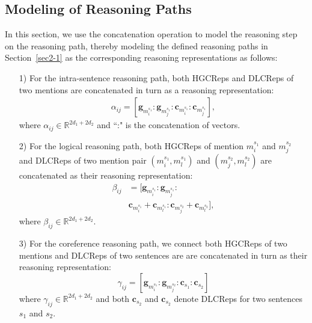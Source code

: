 \documentclass[11pt,a4paper]{article}
\begin{document}
\subsection{Modeling of Reasoning Paths}
\label{sec3-3}
In this section, we use the concatenation operation to model the reasoning step on the reasoning path, thereby modeling the defined reasoning paths in Section~\ref{sec2-1} as the corresponding reasoning representations as follows:
\begin{enumerate}
\item[1)] For the intra-sentence reasoning path, both HGCReps and DLCReps of two mentions are concatenated in turn as a reasoning representation:
\begin{equation}
\begin{aligned}
\alpha_{ij}=[\textbf{g}_{m_i^{s_1}}:\textbf{g}_{m_j^{s_1}}:\textbf{c}_{m_i^{s_1}}:\textbf{c}_{m_j^{s_1}}],
\label{eq:intrasetnecefeature}
\end{aligned}
\end{equation}
where $\alpha_{ij}\in \mathbb{R}^{2 d_1+2 d_2}$ and ``:" is the concatenation of vectors.

\item[2)] For the logical reasoning path, both HGCReps of mention $m_i^{s_1}$ and $m_j^{s_2}$ and DLCReps of two mention pair $(m_i^{s_1},m_l^{s_1})$ and $(m_j^{s_2},m_l^{s_2})$ are concatenated as their reasoning representation: 
\begin{equation}
\begin{aligned}
\beta_{ij}&=[\textbf{g}_{m_i^{s_1}}:\textbf{g}_{m_j^{s_1}}:\\
&\textbf{c}_{m_i^{s_1}}+\textbf{c}_{m_l^{s_1}}:\textbf{c}_{m_j^{s_2}}+\textbf{c}_{m_l^{s_2}}],
\end{aligned}
\label{eq:logicalfeature}
\end{equation}
where $\beta_{ij}\in \mathbb{R}^{2 d_1+2 d_2}$.

\item[3)] For the coreference reasoning path, we connect both HGCReps of two mentions and DLCReps of two sentences are are concatenated in turn as their reasoning representation:
\begin{equation}
\gamma_{ij}=[\textbf{g}_{m_i^{s_1}}:\textbf{g}_{m_j^{s_2}}:\textbf{c}_{s_1}:\textbf{c}_{s_2}]
\label{eq:coreferencefeature}
\end{equation}
where $\gamma_{ij}\in \mathbb{R}^{2 d_1+2 d_2}$ and both $\textbf{c}_{s_2}$ and $\textbf{c}_{s_2}$ denote DLCReps for two sentences ${s_1}$ and ${s_2}$.

\end{enumerate}
\end{document}
